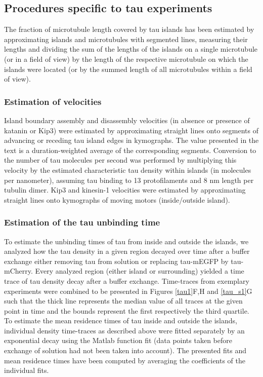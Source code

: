 \subsection{Procedures specific to tau experiments}
The fraction of microtubule length covered by tau islands has been estimated by approximating islands and microtubules with segmented lines, measuring their lengths and dividing the sum of the lengths of the islands on a single microtubule (or in a field of view) by the length of the respective microtubule on which the islands were located (or by the summed length of all microtubules within a field of view).

\subsubsection{Estimation of velocities}
Island boundary assembly and disassembly velocities (in absence or presence of katanin or Kip3) were estimated by approximating straight lines onto segments of advancing or receding tau island edges in kymographs. The value presented in the text is a duration-weighted average of the corresponding segments. Conversion to the number of tau molecules per second was performed by multiplying this velocity by the estimated characteristic tau density within islands (in molecules per nanometer), assuming tau binding to 13 protofilaments and 8 nm length per tubulin dimer. Kip3 and kinesin-1 velocities were estimated by approximating straight lines onto kymographs of moving motors (inside/outside island). 

\subsubsection{Estimation of the tau unbinding time}
To estimate the unbinding times of tau from inside and outside the islands, we analyzed how the tau density in a given region decayed over time after a buffer exchange either removing tau from solution or replacing tau-mEGFP by tau-mCherry. Every analyzed region (either island or surrounding) yielded a time trace of tau density decay after a buffer exchange. Time-traces from exemplary experiments were combined to be presented in Figures \ref{tau1}F,H and \ref{tau_s1}G  such that the thick line represents the median value of all traces at the given point in time and the bounds represent the first respectively the third quartile. To estimate the mean residence times of tau inside and outside the islands, individual density time-traces as described above were fitted separately by an exponential decay using the Matlab function fit (data points taken before exchange of solution had not been taken into account). The presented fits and mean residence times have been computed by averaging the coefficients of the individual fits.

